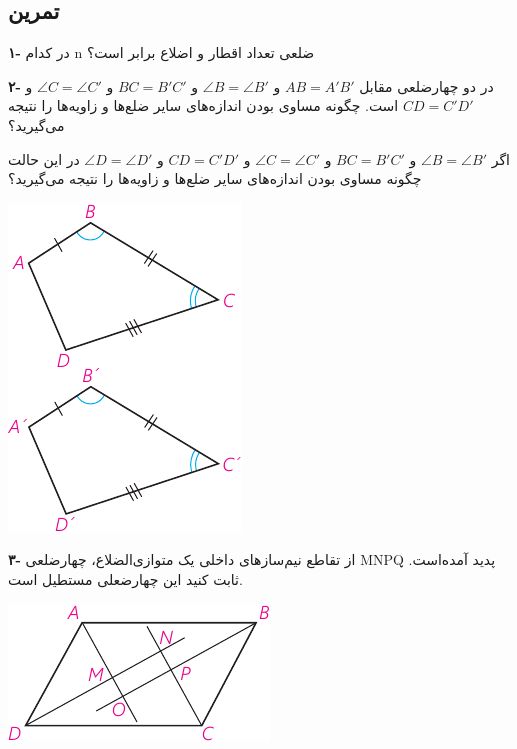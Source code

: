 \documentclass[12pt, a4paper]{book}
\newenvironment{Figure}
{\par\medskip\noindent\minipage{\linewidth}}
{\endminipage\par\medskip}
\begin{document}
\subsection{تمرین}
	\begin{multicols}{2}
			\textbf{۱-} در کدام n ضلعی تعداد اقطار و اضلاع برابر است؟
			\bigskip
			
				\textbf{۲- }در دو چهارضلعی مقابل 
			$ AB = A'B' $
			و
			$ \angle B = \angle B' $
			و
			$ BC = B'C' $
			و
			$ \angle C = \angle C' $
			و
			$ CD = C'D' $
			است. چگونه مساوی بودن اندازه‌های سایر ضلع‌ها و زاویه‌ها را نتیجه می‌گیرید؟
			
			اگر 
			$ \angle B = \angle B' $
			و
			$ BC = B'C' $
			و
			$ \angle C = \angle C' $
			و
			$ CD = C'D' $
			و
			$ \angle D = \angle D' $
			در این حالت چگونه مساوی بودن اندازه‌های سایر ضلع‌ها و زاویه‌ها را نتیجه می‌گیرید؟

		\begin{Figure}
			\centering
			\includegraphics[scale=1.2]{"Shapes/Fasl - 3/Dars 1/PDFs/P63-S3,4.pdf"}
		\end{Figure}

\bigskip
				\textbf{۳-} از تقاطع نیم‌سازهای داخلی یک متوازی‌الضلاع، چهارضلعی
			MNPQ
			پدید آمده‌است. ثابت کنید این چهارضعلی مستطیل است.
			




		\begin{Figure}
			\centering
			\includegraphics[scale=1.2]{"Shapes/Fasl - 3/Dars 1/PDFs/P63-S5.pdf"}
		\end{Figure}


\end{multicols}
\end{document}
